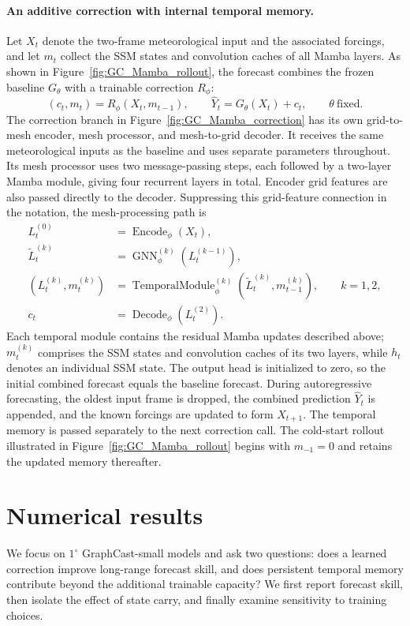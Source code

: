 \documentclass{article}
\begin{document}
\paragraph{An additive correction with internal temporal memory.}
Let $X_t$ denote the two-frame meteorological input and the associated forcings, and let $m_t$ collect the SSM states and convolution caches of all Mamba layers. As shown in Figure~\ref{fig:GC_Mamba_rollout}, the forecast combines the frozen baseline $G_\theta$ with a trainable correction $R_\phi$:
\begin{equation}
    (c_t,m_t)=R_\phi(X_t,m_{t-1}),
    \qquad
    \hat{Y}_t=G_\theta(X_t)+c_t,
    \qquad \theta\ \text{fixed}.
    \label{eq:additive_correction}
\end{equation}
The correction branch in Figure~\ref{fig:GC_Mamba_correction} has its own grid-to-mesh encoder, mesh processor, and mesh-to-grid decoder. It receives the same meteorological inputs as the baseline and uses separate parameters throughout. Its mesh processor uses two message-passing steps, each followed by a two-layer Mamba module, giving four recurrent layers in total. Encoder grid features are also passed directly to the decoder. Suppressing this grid-feature connection in the notation, the mesh-processing path is
\begin{align}
    L_t^{(0)} &= \operatorname{Encode}_\phi(X_t),\\
    \widetilde{L}_t^{(k)} &= \operatorname{GNN}^{(k)}_\phi(L_t^{(k-1)}),\\
    (L_t^{(k)},m_t^{(k)})
    &=\operatorname{TemporalModule}^{(k)}_\phi
       (\widetilde{L}_t^{(k)},m_{t-1}^{(k)}),\qquad k=1,2,\\
    c_t &= \operatorname{Decode}_\phi(L_t^{(2)}).
\end{align}
Each temporal module contains the residual Mamba updates described above; $m_t^{(k)}$ comprises the SSM states and convolution caches of its two layers, while $h_t$ denotes an individual SSM state. The output head is initialized to zero, so the initial combined forecast equals the baseline forecast. During autoregressive forecasting, the oldest input frame is dropped, the combined prediction $\hat{Y}_t$ is appended, and the known forcings are updated to form $X_{t+1}$. The temporal memory is passed separately to the next correction call. The cold-start rollout illustrated in Figure~\ref{fig:GC_Mamba_rollout} begins with $m_{-1}=0$ and retains the updated memory thereafter.

\section{Numerical results}
\label{sec:numerical}
We focus on $1^\circ$ GraphCast-small models and ask two questions: does a learned correction improve long-range forecast skill, and does persistent temporal memory contribute beyond the additional trainable capacity? We first report forecast skill, then isolate the effect of state carry, and finally examine sensitivity to training choices.
\end{document}
